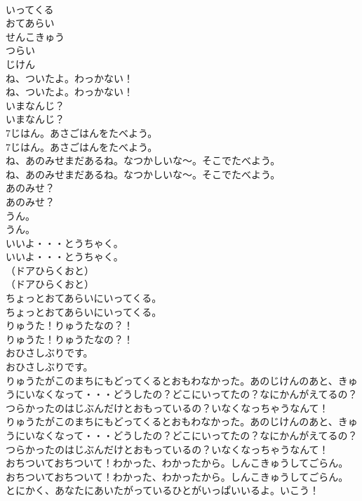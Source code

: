 \documentclass[8pt]{extreport}
\begin{document}
\begin{CJK}{UTF8}{min}
\\	いってくる
\\	おてあらい
\\	せんこきゅう
\\	つらい
\\	じけん
\\	ね、ついたよ。わっかない！	
\\	ね、ついたよ。わっかない！ 
\\	いまなんじ？	
\\	いまなんじ？ 
\\	7じはん。あさごはんをたべよう。	
\\	7じはん。あさごはんをたべよう。 
\\	ね、あのみせまだあるね。なつかしいな～。そこでたべよう。	
\\	ね、あのみせまだあるね。なつかしいな～。そこでたべよう。 
\\	あのみせ？	
\\	あのみせ？ 
\\	うん。	
\\	うん。 
\\	いいよ・・・とうちゃく。	
\\	いいよ・・・とうちゃく。 
\\	（ドアひらくおと）	
\\	（ドアひらくおと） 
\\	ちょっとおてあらいにいってくる。	
\\	ちょっとおてあらいにいってくる。 
\\	りゅうた！りゅうたなの？！	
\\	りゅうた！りゅうたなの？！ 
\\	おひさしぶりです。	
\\	おひさしぶりです。 
\\	りゅうたがこのまちにもどってくるとおもわなかった。あのじけんのあと、きゅうにいなくなって・・・どうしたの？どこにいってたの？なにかんがえてるの？つらかったのはじぶんだけとおもっているの？いなくなっちゃうなんて！	
\\	りゅうたがこのまちにもどってくるとおもわなかった。あのじけんのあと、きゅうにいなくなって・・・どうしたの？どこにいってたの？なにかんがえてるの？つらかったのはじぶんだけとおもっているの？いなくなっちゃうなんて！ 
\\	おちついておちついて！わかった、わかったから。しんこきゅうしてごらん。	
\\	おちついておちついて！わかった、わかったから。しんこきゅうしてごらん。 
\\	とにかく、あなたにあいたがっているひとがいっぱいいるよ。いこう！	

\end{CJK}
\end{document}
